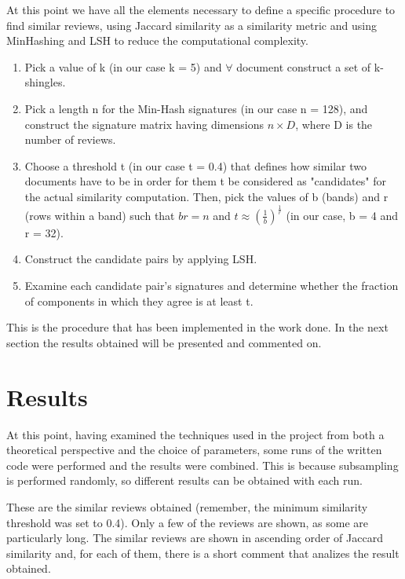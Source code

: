 \documentclass[12pt, a4paper]{article}
\begin{document}
At this point we have all the elements necessary to define a specific procedure to find similar reviews, using Jaccard similarity as a similarity metric and using MinHashing and LSH to reduce the computational complexity.
\begin{enumerate}
    \item Pick a value of k (in our case k = 5) and $\forall$ document construct a set of k-shingles.
    \item Pick a length n for the Min-Hash signatures (in our case n = 128), and construct the signature matrix having dimensions $n \times D$, where D is the number of reviews.
    \item Choose a threshold t (in our case t = 0.4) that defines how similar two documents have to be in order for them t be considered as "candidates" for the actual similarity computation. Then, pick the values of b (bands) and r (rows within a band) such that $br=n$ and $t \approx (\frac{1}{b})^\frac{1}{r}$ (in our case, b = 4 and r = 32).
    \item Construct the candidate pairs by applying LSH.
    \item Examine each candidate pair's signatures and determine whether the fraction of components in which they agree is at least t. 
\end{enumerate}
This is the procedure that has been implemented in the work done. In the next section the results obtained will be presented and commented on.

\section{Results}
At this point, having examined the techniques used in the project from both a theoretical perspective and the choice of parameters, some runs of the written code were performed and the results were combined. This is because subsampling is performed randomly, so different results can be obtained with each run.

These are the similar reviews obtained (remember, the minimum similarity threshold was set to 0.4). Only a few of the reviews are shown, as some are particularly long. The similar reviews are shown in ascending order of Jaccard similarity and, for each of them, there is a short comment that analizes the result obtained.
\end{document}
